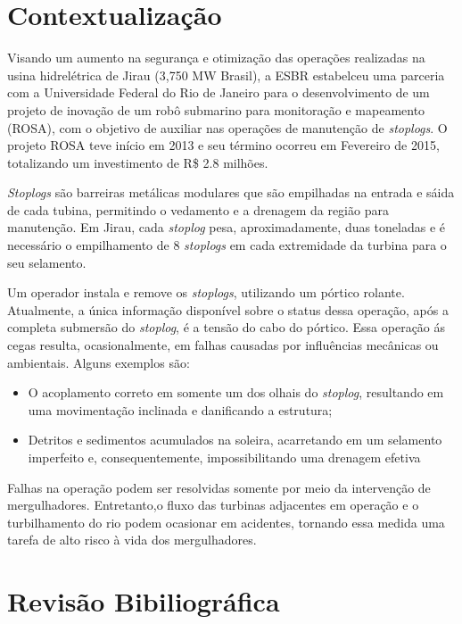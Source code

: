 \section{Contextualização}
Visando um aumento na segurança e otimização das operações realizadas na usina 
hidrelétrica de Jirau (3,750 MW Brasil), a ESBR estabelceu uma parceria com a 
Universidade Federal do Rio de Janeiro para o desenvolvimento de um projeto de 
inovação de um robô submarino para monitoração e mapeamento (ROSA), com o
objetivo de auxiliar nas operações de manutenção de \textit{stoplogs}. O projeto
ROSA teve início em 2013 e seu término ocorreu em Fevereiro de 2015, totalizando
um investimento de R\$ 2.8 milhões.

\textit{Stoplogs} são barreiras metálicas modulares que são empilhadas na
entrada e sáida de cada tubina, permitindo o vedamento e a drenagem da
região para manutenção. Em Jirau, cada \textit{stoplog} pesa, aproximadamente,
duas toneladas e é necessário o empilhamento de 8 \textit{stoplogs} em cada
extremidade da turbina para o seu selamento.

Um operador instala e remove os \textit{stoplogs}, utilizando um pórtico
rolante. Atualmente, a única informação disponível sobre o status dessa
operação, após a completa submersão do \textit{stoplog}, é a tensão do cabo do
pórtico. Essa operação ás cegas resulta, ocasionalmente, em falhas causadas 
por influências mecânicas ou ambientais. Alguns exemplos são:

\begin{itemize}
\item O acoplamento correto em somente um dos olhais do \textit{stoplog},
resultando em uma movimentação inclinada e danificando a estrutura;
\item Detritos e sedimentos acumulados na soleira, acarretando em um selamento
imperfeito e, consequentemente, impossibilitando uma drenagem efetiva
\end{itemize}

Falhas na operação podem ser resolvidas somente por meio da intervenção de
mergulhadores. Entretanto,o fluxo das turbinas adjacentes em operação e o
turbilhamento do rio podem ocasionar em acidentes, tornando essa medida uma 
tarefa de alto risco à vida dos mergulhadores.

\section{Revisão Bibiliográfica}


